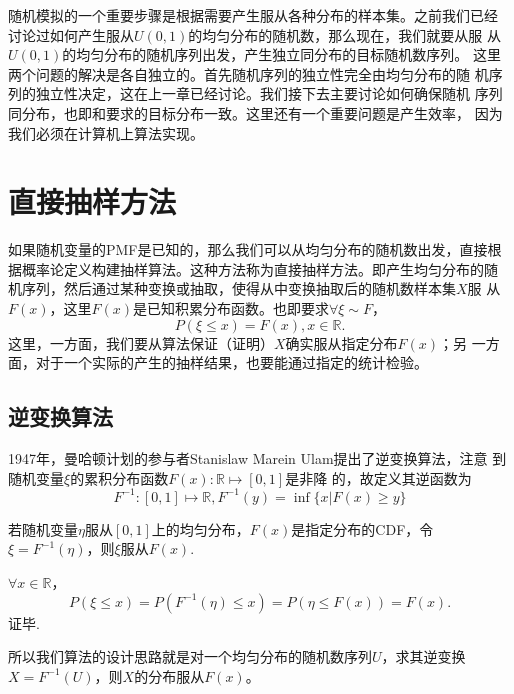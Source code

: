 随机模拟的一个重要步骤是根据需要产生服从各种分布的样本集。之前我们已经
讨论过如何产生服从$U(0, 1)$的均匀分布的随机数，那么现在，我们就要从服
从$U(0, 1)$的均匀分布的随机序列出发，产生独立同分布的目标随机数序列。
这里两个问题的解决是各自独立的。首先随机序列的独立性完全由均匀分布的随
机序列的独立性决定，这在上一章已经讨论。我们接下去主要讨论如何确保随机
序列同分布，也即和要求的目标分布一致。这里还有一个重要问题是产生效率，
因为我们必须在计算机上算法实现。

\section{直接抽样方法}
如果随机变量的PMF是已知的，那么我们可以从均匀分布的随机数出发，直接根
据概率论定义构建抽样算法。这种方法称为直接抽样方法。即产生均匀分布的随
机序列，然后通过某种变换或抽取，使得从中变换抽取后的随机数样本集$X$服
从$F(x)$，这里$F(x)$是已知积累分布函数。也即要求$\forall \xi \sim F$，
\begin{equation}
  P(\xi \leq x) = F(x), x \in \mathbb{R}.
  \label{eq::def_cdf}
\end{equation}
这里，一方面，我们要从算法保证（证明）$X$确实服从指定分布$F(x)$；另
一方面，对于一个实际的产生的抽样结果，也要能通过指定的统计检验。

\subsection{逆变换算法}

1947年，曼哈顿计划的参与者Stanislaw Marein Ulam提出了逆变换算法，注意
到随机变量$\xi$的累积分布函数$F(x): \mathbb{R} \mapsto [0, 1]$是非降
的，故定义其逆函数为
\begin{equation}
  F^{-1}: [0, 1] \mapsto \mathbb{R}, F^{-1}(y) = \inf \{x \left| F(x)
  \geq y \right.\}
  \label{eq::inv_cdf}
\end{equation}

\begin{theorem}{}
  若随机变量$\eta$服从$[0, 1]$上的均匀分布，$F(x)$是指定分布的CDF，令
  $\xi = F^{-1}(\eta)$，则$\xi$服从$F(x)$.

   $\forall x \in \mathbb{R}$，
  \begin{equation}
    P(\xi \leq x) = P(F^{-1}(\eta) \leq x) = P(\eta \leq F(x)) = F(x).
    \label{eq::prof_inv_cdf}
  \end{equation}
  证毕.
  \label{thm::inv_cdf}
\end{theorem}

所以我们算法的设计思路就是对一个均匀分布的随机数序列$U$，求其逆变换$X
= F^{-1}(U)$，则$X$的分布服从$F(x)$。

